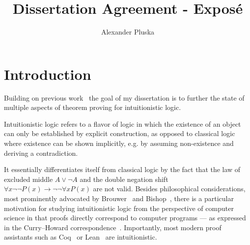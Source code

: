 \documentclass{article}
\author{Alexander Pluska}
\title{Dissertation Agreement - Exposé}
\theoremstyle{definition}
\theoremstyle{definition}
\theoremstyle{definition}
\theoremstyle{definition}
\theoremstyle{definition}
\theoremstyle{definition}
\theoremstyle{definition}
\newcommand{\0}{\mathbf 0}
\newcommand{\1}{\mathbf 1}
\begin{document}
	

	\maketitle

	\section{Introduction}
	
	Building on previous work~\cite{thesis,pluska2023embedding} the goal of my dissertation is to further the state of multiple aspects of theorem proving for intuitionistic logic.

	Intuitionistic logic refers to a flavor of logic in which the existence of an object can only be established by explicit construction, as opposed to classical logic where existence can be shown implicitly, e.g. by assuming non-existence and deriving a contradiction.

	It essentially differentiates itself from classical logic by the fact that the law of excluded middle $A\vee\neg A$ and the double negation shift $\forall x\neg\neg P(x)\to\neg\neg\forall xP(x)$ are not valid.
	Besides philosophical considerations, most prominently advocated by Brouwer~\cite{brouwer1907over} and Bishop~\cite{bishop1967foundations}, there is a particular motivation for studying intuitionistic logic from the perspective of computer science in that proofs directly correspond to computer programs --- as expressed in the Curry--Howard correspondence~\cite{howard1980formulae}. Importantly, most modern proof assistants such as Coq~\cite{bertot2013interactive} or Lean~\cite{de2015lean} are intuitionistic.
\end{document}
